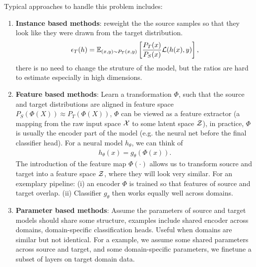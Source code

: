 \documentclass[11pt]{article}  %
\begin{document}
Typical approaches to handle this problem includes: 
\begin{enumerate}
  \item \textbf{Instance based methods}: reweight the the source samples so that they look like they were drawn from the target distribution.
  \begin{align*}
    \epsilon_T(h) = \mathbb{E}_{(x, y)\sim P_T(x, y)}\left[\frac{P_T(x)}{P_S(x)}\mathcal{L}(h(x), y)\right],
  \end{align*}
  there is no need to change the struture of the model, but the ratios are hard to estimate especially in high dimensions.

  \item \textbf{Feature based methods}: Learn a transformation $\Phi$, such that the source and target distributions are aligned in feature space $P_S(\Phi(X)) \approx P_T(\Phi(X))$, $\Phi$ can be viewed as a feature extractor (a mapping from the raw input space $\mathcal{X}$ to some latent space $\mathcal{Z}$), in practice, $\Phi$ is usually the encoder part of the model (e.g. the neural net before the final classifier head).
  For a neural model $h_\theta$, we can think of 
  \begin{align*}
    h_\theta(x) = g_\theta(\Phi(x)).
  \end{align*}
  The introduction of the feature map $\Phi(\cdot)$ allows us to transform soucre and target into a feature space $\mathcal{Z}$, where they will look very similar. 
  For an exemplary pipeline: (i) an encoder $\Phi$ is trained so that features of source and target overlap.
  (ii) Classifier $g_\theta$ then works equally well across domains.
  
  \item \textbf{Parameter based methods}: Assume the parameters of source and target models should share some structure, examples include shared encoder across domains, domain-specific classification heads.
  Useful when domains are similar but not identical. 
  For a example, we assume some shared parameters across source and target, and some domain-specific parameters, we finetune a subset of layers on target domain data.
\end{enumerate}
\end{document}
